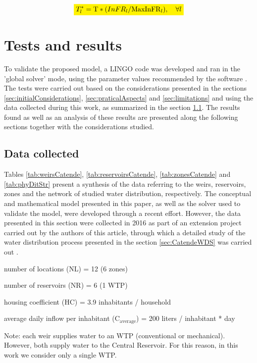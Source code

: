 \documentclass{singlecol}
\newcommand{\mathcolorbox}[2]{\colorbox{#1}{$\displaystyle #2$}}
\theoremstyle{TH}{
\newtheorem{lemma}{Lemma}
\newtheorem{theorem}[lemma]{Theorem}
\newtheorem{corrolary}[lemma]{Corrolary}
\newtheorem{conjecture}[lemma]{Conjecture}
\newtheorem{proposition}[lemma]{Proposition}
\newtheorem{claim}[lemma]{Claim}
\newtheorem{stheorem}[lemma]{Wrong Theorem}
\newtheorem{algorithm}{Algorithm}
}
\theoremstyle{THrm}{
\newtheorem{definition}{Definition}[section]
\newtheorem{question}{Question}[section]
\newtheorem{remark}{Remark}
\newtheorem{scheme}{Scheme}
}
\theoremstyle{THhit}{
\newtheorem{case}{Case}[section]
}
\begin{document}
\begin{equation}
	\mathcolorbox{yellow}{T^*_{l} = \mathrm{T} * ({InFR}_l / \mathrm{MaxInFR}_{l}), \quad \forall l}
	\label{eq:evalTimeAdq}
\end{equation}


\section{Tests and results}

To validate the proposed model, a LINGO code was developed and ran in the 'global solver' mode, using the parameter values recommended by the software \cite{LINGO}. The tests were carried out based on the considerations presented in the sections \ref{sec:initialConsiderations}, \ref{sec:praticalAspects} and \ref{sec:limitations} and using the data collected during this work, as summarized in the section \ref{sec:data}. The results found as well as an analysis of these results are presented along the following sections together with the considerations studied. 

\subsection{Data collected}
\label{sec:data}

Tables \ref{tab:weirsCatende}, \ref{tab:reservoirsCatende}, \ref{tab:zonesCatende} and \ref{tab:phyDitStr} present a synthesis of the data referring to the weirs, reservoirs, zones and the network of studied water distribution, respectively. The conceptual and mathematical model presented in this paper, as well as the solver used to validate the model, were developed through a recent effort. However, the data presented in this section were collected in 2016 as part of an extension project carried out by the authors of this article, through which a detailed study of the water distribution process presented in the section \ref{sec:CatendeWDS} was carried out \citep{CandidoEtAl2016}. 

\noindent number of locations (NL) = 12 (6 zones) 

\noindent number of reservoirs (NR) = 6 (1 WTP) 

\noindent housing coefficient ($\mathrm{HC}$) = 3.9 inhabitants / household 

\noindent average daily inflow per inhabitant ($\mathrm{C_{average}}$) = 200 liters / inhabitant * day 

\noindent Note: each weir supplies water to an WTP (conventional or mechanical). However, both supply water to the Central Reservoir. For this reason, in this work we consider only a single WTP. 
\end{document}
